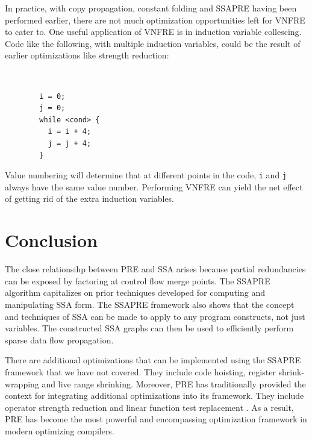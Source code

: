 In practice, with copy propagation, constant folding and SSAPRE having been 
performed earlier, there are not much optimization opportunities left 
for VNFRE to cater to.  One useful application of VNFRE is in induction
variable collescing.  Code like the following, with multiple induction
variables, could be the result of
earlier optimizations like strength reduction:
{\tt
\begin{verbatim}
        i = 0;
        j = 0;
        while <cond> {
          i = i + 4;
          j = j + 4;
        }
\end{verbatim}
}

Value numbering will determine that at different points in the code, {\tt i}
and {\tt j} always have the same value number.  Performing VNFRE can yield the
net effect of getting rid of the extra induction variables.

\section{Conclusion}

The close relationsihp between PRE and SSA arises because 
partial redundancies can be exposed by factoring at control flow merge points.
The SSAPRE algorithm capitalizes on prior techniques developed for computing 
and manipulating SSA form.  The SSAPRE framework also shows that the 
concept and techniques of SSA can be made to apply to any program constructs, 
not just variables.  The constructed SSA graphs can then be used to 
efficiently perform sparse data flow propagation.

There are additional optimizations that can be implemented using the SSAPRE
framework that we have not covered.  They include code hoisting, register 
shrink-wrapping \cite{Chow88} and live range shrinking.  Moreover, PRE has 
traditionally provided the context for integrating additional optimizations 
into its framework.  They include operator strength reduction \cite{Knoop93} 
and linear function test replacement \cite{Kennedy98}.  As a result, PRE 
has become the most powerful and encompassing optimization framework in modern 
optimizing compilers.

